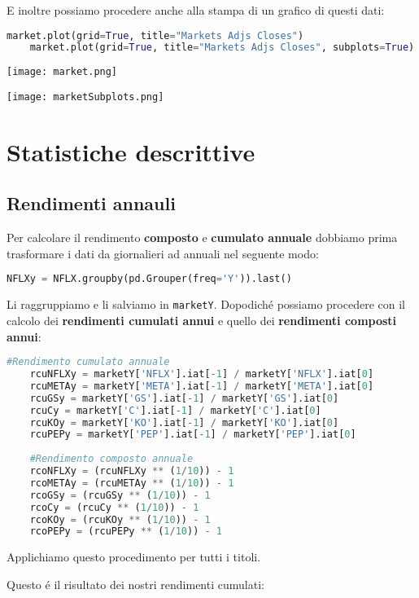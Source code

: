 \documentclass{report}
\begin{document}
E inoltre possiamo procedere anche alla stampa di un grafico di questi dati:
\begin{lstlisting}[language=python]
    market.plot(grid=True, title="Markets Adjs Closes")
    market.plot(grid=True, title="Markets Adjs Closes", subplots=True)
\end{lstlisting}

\texttt{[image: market.png]}

\texttt{[image: marketSubplots.png]}

\chapter{Statistiche descrittive}
\section{Rendimenti annauli}
Per calcolare il rendimento \textbf{composto} e \textbf{cumulato annuale} dobbiamo prima trasformare i dati da giornalieri ad annuali nel seguente modo:
\begin{lstlisting}[language=python]
    NFLXy = NFLX.groupby(pd.Grouper(freq='Y')).last()
\end{lstlisting}
Li raggruppiamo e li salviamo in \lstinline{marketY}.
Dopodiché possiamo procedere con il calcolo dei \textbf{rendimenti cumulati annui} e quello dei \textbf{rendimenti composti annui}:
\begin{lstlisting}[language=python]
    #Rendimento cumulato annuale
    rcuNFLXy = marketY['NFLX'].iat[-1] / marketY['NFLX'].iat[0]
    rcuMETAy = marketY['META'].iat[-1] / marketY['META'].iat[0]
    rcuGSy = marketY['GS'].iat[-1] / marketY['GS'].iat[0]
    rcuCy = marketY['C'].iat[-1] / marketY['C'].iat[0]
    rcuKOy = marketY['KO'].iat[-1] / marketY['KO'].iat[0]
    rcuPEPy = marketY['PEP'].iat[-1] / marketY['PEP'].iat[0]
    
    #Rendimento composto annuale
    rcoNFLXy = (rcuNFLXy ** (1/10)) - 1
    rcoMETAy = (rcuMETAy ** (1/10)) - 1
    rcoGSy = (rcuGSy ** (1/10)) - 1
    rcoCy = (rcuCy ** (1/10)) - 1
    rcoKOy = (rcuKOy ** (1/10)) - 1
    rcoPEPy = (rcuPEPy ** (1/10)) - 1
\end{lstlisting}
Applichiamo questo procedimento per tutti i titoli.

\noindent Questo é il risultato dei nostri rendimenti cumulati:
\end{document}
